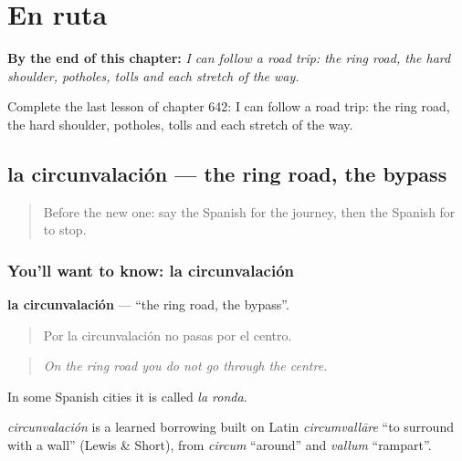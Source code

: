 
\chapter{En ruta}
\label{ch:es-en-ruta}

\begin{chapteropening}
\textbf{By the end of this chapter:} \emph{I can follow a road trip: the ring road, the hard shoulder, potholes, tolls and each stretch of the way.}

Complete the last lesson of chapter 642: I can follow a road trip: the ring road, the hard shoulder, potholes, tolls and each stretch of the way.
\end{chapteropening}

\section[la circunvalación]{la circunvalación — the ring road, the bypass}

\label{lesson:ES-C642-circunvalacion}



\begin{quote}
Before the new one: say the Spanish for the journey, then the Spanish for to stop.
\end{quote}

\subsection*{You'll want to know: la circunvalación}
\textbf{la circunvalación} — \textquotedblleft{}the ring road, the bypass\textquotedblright{}.

\begin{quote}
Por la circunvalación no pasas por el centro.
\end{quote}

\begin{quote}
\emph{On the ring road you do not go through the centre.}
\end{quote}

In some Spanish cities it is called \emph{la ronda}.

\begin{cousinweb}
\emph{circunvalación} is a learned borrowing built on Latin \emph{circumvallāre} \textquotedblleft{}to surround with a wall\textquotedblright{} (Lewis \& Short), from \emph{circum} \textquotedblleft{}around\textquotedblright{} and \emph{vallum} \textquotedblleft{}rampart\textquotedblright{}.
\end{cousinweb}

